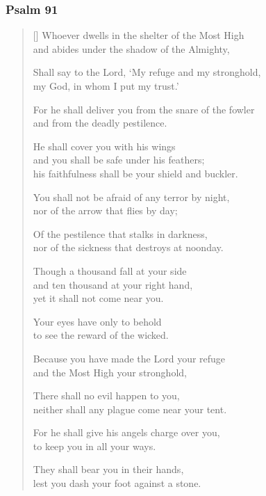 \documentclass[12pt]{extreport}
\begin{document}
	\subsubsection*{Psalm 91}

	\begin{verse}[\versewidth]
		Whoever dwells in the shelter of the Most High \Pause\\
		and abides under the shadow of the Almighty,

		Shall say to the Lord, ‘My refuge and my stronghold, \Pause\\
		my God, in whom I put my trust.’

		For he shall deliver you from the snare of the fowler \Pause\\
		and from the deadly pestilence.

		He shall cover you with his wings\\
		\vin and you shall be safe under his feathers; \Pause\\
		his faithfulness shall be your shield and buckler.

		You shall not be afraid of any terror by night, \Pause\\
		nor of the arrow that flies by day;

		Of the pestilence that stalks in darkness, \Pause\\
		nor of the sickness that destroys at noonday.

		Though a thousand fall at your side\\
		\vin and ten thousand at your right hand, \Pause\\
		yet it shall not come near you.

		Your eyes have only to behold \Pause\\
		to see the reward of the wicked.

		Because you have made the Lord your refuge \Pause\\
		and the Most High your stronghold,

		There shall no evil happen to you, \Pause\\
		neither shall any plague come near your tent.

		For he shall give his angels charge over you, \Pause\\
		to keep you in all your ways.

		They shall bear you in their hands, \Pause\\
		lest you dash your foot against a stone.


\end{verse}
\end{document}
